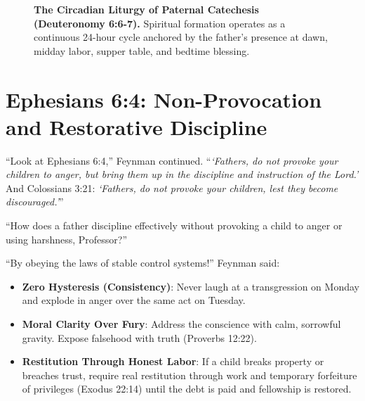 \documentclass[11pt]{report}
\begin{document}
\begin{figure}[H]
\caption{\textbf{The Circadian Liturgy of Paternal Catechesis (Deuteronomy 6:6-7).} Spiritual formation operates as a continuous 24-hour cycle anchored by the father's presence at dawn, midday labor, supper table, and bedtime blessing.}
\label{fig:circadian_liturgy}
\end{figure}

\section{Ephesians 6:4: Non-Provocation and Restorative Discipline}
``Look at Ephesians 6:4,'' Feynman continued. ``\textit{`Fathers, do not provoke your children to anger, but bring them up in the discipline and instruction of the Lord.'} And Colossians 3:21: \textit{`Fathers, do not provoke your children, lest they become discouraged.'}''

``How does a father discipline effectively without provoking a child to anger or using harshness, Professor?''

``By obeying the laws of stable control systems!'' Feynman said:
\begin{itemize}
    \item \textbf{Zero Hysteresis (Consistency)}: Never laugh at a transgression on Monday and explode in anger over the same act on Tuesday.
    \item \textbf{Moral Clarity Over Fury}: Address the conscience with calm, sorrowful gravity. Expose falsehood with truth (Proverbs 12:22).
    \item \textbf{Restitution Through Honest Labor}: If a child breaks property or breaches trust, require real restitution through work and temporary forfeiture of privileges (Exodus 22:14) until the debt is paid and fellowship is restored.
\end{itemize}
\end{document}
